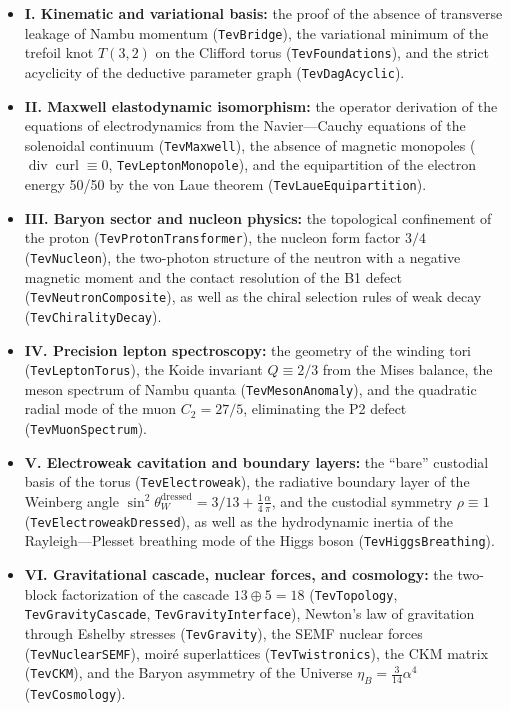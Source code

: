 \documentclass[11pt,a4paper]{article}
\theoremstyle{definition}
\theoremstyle{remark}
\begin{document}
\begin{itemize}
    \item \textbf{I. Kinematic and variational basis:} the proof of the absence of transverse leakage of Nambu momentum (\texttt{TevBridge}), the variational minimum of the trefoil knot $T(3,2)$ on the Clifford torus (\texttt{TevFoundations}), and the strict acyclicity of the deductive parameter graph (\texttt{TevDagAcyclic}).

    \item \textbf{II. Maxwell elastodynamic isomorphism:} the operator derivation of the equations of electrodynamics from the Navier---Cauchy equations of the solenoidal continuum (\texttt{TevMaxwell}), the absence of magnetic monopoles ($\operatorname{div}\operatorname{curl} \equiv 0$, \texttt{TevLeptonMonopole}), and the equipartition of the electron energy 50/50 by the von Laue theorem (\texttt{TevLaueEquipartition}).

    \item \textbf{III. Baryon sector and nucleon physics:} the topological confinement of the proton (\texttt{TevProtonTransformer}), the nucleon form factor $3/4$ (\texttt{TevNucleon}), the two-photon structure of the neutron with a negative magnetic moment and the contact resolution of the B1 defect (\texttt{TevNeutronComposite}), as well as the chiral selection rules of weak decay (\texttt{TevChiralityDecay}).

    \item \textbf{IV. Precision lepton spectroscopy:} the geometry of the winding tori (\texttt{TevLeptonTorus}), the Koide invariant $Q \equiv 2/3$ from the Mises balance, the meson spectrum of Nambu quanta (\texttt{TevMesonAnomaly}), and the quadratic radial mode of the muon $C_2 = 27/5$, eliminating the P2 defect (\texttt{TevMuonSpectrum}).

    \item \textbf{V. Electroweak cavitation and boundary layers:} the ``bare'' custodial basis of the torus (\texttt{TevElectroweak}), the radiative boundary layer of the Weinberg angle $\sin^2\theta_W^{\mathrm{dressed}} = 3/13 + \frac{1}{4}\frac{\alpha}{\pi}$, and the custodial symmetry $\rho \equiv 1$ (\texttt{TevElectroweakDressed}), as well as the hydrodynamic inertia of the Rayleigh---Plesset breathing mode of the Higgs boson (\texttt{TevHiggsBreathing}).

    \item \textbf{VI. Gravitational cascade, nuclear forces, and cosmology:} the two-block factorization of the cascade $13 \oplus 5 = 18$ (\texttt{TevTopology}, \texttt{TevGravityCascade}, \texttt{TevGravityInterface}), Newton's law of gravitation through Eshelby stresses (\texttt{TevGravity}), the SEMF nuclear forces (\texttt{TevNuclearSEMF}), moiré superlattices (\texttt{TevTwistronics}), the CKM matrix (\texttt{TevCKM}), and the Baryon asymmetry of the Universe $\eta_B = \frac{3}{14}\alpha^4$ (\texttt{TevCosmology}).
\end{itemize}
\end{document}

